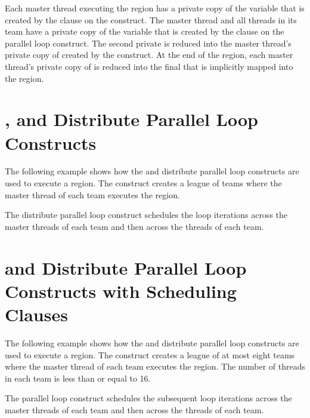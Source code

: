 Each master thread executing the  region has a private copy of the 
variable  that is created by the  clause on the  construct. 
The master thread and all threads in its team have a private copy of the variable 
 that is created by the  clause on the parallel loop construct. 
The second private  is reduced into the master thread's private copy of  
created by the  construct. At the end of the  region, 
each master thread's private copy of  is reduced into the final  that is 
implicitly mapped into the  region.



\section{ , and Distribute Parallel Loop Constructs}

The following example shows how the   and distribute 
parallel loop constructs are used to execute a  region. The  
 construct creates a league of teams where the master thread of each 
team executes the  region.

The distribute parallel loop construct schedules the loop iterations across the 
master threads of each team and then across the threads of each team.



\section{  and Distribute Parallel Loop 
Constructs with Scheduling Clauses}

The following example shows how the   and distribute 
parallel loop constructs are used to execute a  region. The  
construct creates a league of at most eight teams where the master thread of each 
team executes the  region. The number of threads in each team is 
less than or equal to 16.

The  parallel loop construct schedules the subsequent loop iterations 
across the master threads of each team and then across the threads of each team.

